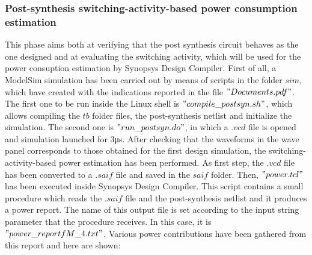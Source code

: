 \subsubsection{Post-synthesis switching-activity-based power consumption estimation}
This phase aims both at verifying that the post synthesis circuit behaves as the one designed and at evaluating the switching activity, which will be used for the power consuption estimation by Synopsys Design Compiler.
\newline
\newline
First of all, a ModelSim simulation has been carried out by means of scripts in the folder $sim$, which have created with the indications reported in the file $"Documents.pdf"$. The first one to be run inside the Linux shell is $"compile\_postsyn.sh"$, which allows compiling the $tb$ folder files, the post-synthesis netlist and initialize the simulation. The second one is $"run\_postsyn.do"$, in which a $.vcd$ file is opened and simulation launched for 3\si{\micro\second}.
\newline
\newline
After checking that the waveforms in the wave panel corresponds to those obtained for the first design simulation, the switching-activity-based power estimation has been performed.
As first step, the $.vcd$ file has been converted to a $.saif$ file and saved in the $saif$ folder. Then, $"power.tcl"$ has been executed inside Synopsys Design Compiler. This script contains a small procedure which reads the $.saif$ file and the post-synthesis netlist and it produces a power report. The name of this output file is set according to the input string parameter that the procedure receives. In this case, it is $"power\_reportfM\_4.txt"$.
\newline
\newline
Various power contributions have been gathered from this report and here are shown:

